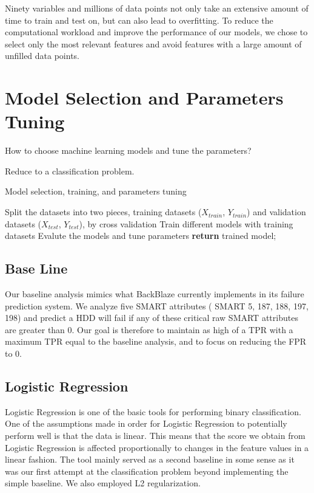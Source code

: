 \documentclass[12pt,a4paper,english]{amsart}
\begin{document}
Ninety variables and millions of data points not only take an extensive amount of time to train and test on, but can also lead to overfitting. To reduce the computational workload and improve the performance of our models, we chose   to   select   only   the   most   relevant   features   and   avoid   features   with   a   large   amount   of   unfilled   data   points.
%
\section{Model Selection and Parameters Tuning}

How to choose machine learning models and tune the parameters?

Reduce to a classification problem.

\begin{algorithm}  
	\caption{Model selection, training, and parameters tuning}
	\LinesNumbered  
	Split the datasets into two pieces, training datasets ($X_{train}$, $Y_{train}$) and validation datasets ($X_{test}$, $Y_{test}$), by cross validation\;
	Train different models with training datasets\;
	{
		Evalute the models and tune parameters\;
	}
	\textbf{return} trained model;
\end{algorithm}  

\subsection*{Base Line}

Our baseline analysis mimics what BackBlaze currently implements in its failure prediction system. We analyze five SMART attributes ( SMART 5, 187, 188, 197, 198) and predict a HDD will fail if any of these critical raw SMART   attributes   are   greater   than   0.
Our goal is therefore to maintain as high of a TPR with a maximum TPR equal to the baseline analysis, and to focus   on   reducing   the   FPR   to   0.

\subsection*{Logistic Regression}

Logistic Regression is one of the basic tools for performing binary classification. One of the assumptions made in order for Logistic Regression to potentially perform well is that the data is linear. This means that the score we obtain from Logistic Regression is affected proportionally to changes in the feature values in a linear fashion. The tool mainly served as a second baseline in some sense as it was our first attempt at the classification problem beyond implementing   the   simple   baseline.   We   also   employed   L2   regularization.
\end{document}

